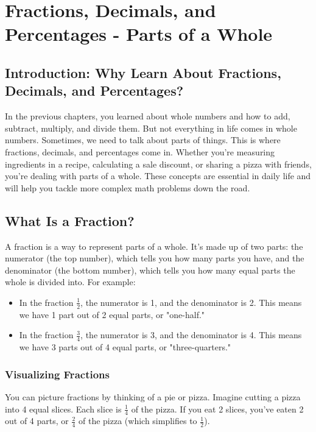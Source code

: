 \chapter{Fractions, Decimals, and Percentages - Parts of a Whole}

\section{Introduction: Why Learn About Fractions, Decimals, and Percentages?}
In the previous chapters, you learned about whole numbers and how to add, subtract, multiply, and divide them. But not everything in life comes in whole numbers. Sometimes, we need to talk about parts of things. This is where fractions, decimals, and percentages come in. Whether you’re measuring ingredients in a recipe, calculating a sale discount, or sharing a pizza with friends, you’re dealing with parts of a whole. These concepts are essential in daily life and will help you tackle more complex math problems down the road.

\section{What Is a Fraction?}
A fraction is a way to represent parts of a whole. It’s made up of two parts: the numerator (the top number), which tells you how many parts you have, and the denominator (the bottom number), which tells you how many equal parts the whole is divided into. For example:
\begin{itemize}
    \item In the fraction $\frac{1}{2}$, the numerator is 1, and the denominator is 2. This means we have 1 part out of 2 equal parts, or "one-half."
    \item In the fraction $\frac{3}{4}$, the numerator is 3, and the denominator is 4. This means we have 3 parts out of 4 equal parts, or "three-quarters."
\end{itemize}

\subsection{Visualizing Fractions}
You can picture fractions by thinking of a pie or pizza. Imagine cutting a pizza into 4 equal slices. Each slice is $\frac{1}{4}$ of the pizza. If you eat 2 slices, you’ve eaten 2 out of 4 parts, or $\frac{2}{4}$ of the pizza (which simplifies to $\frac{1}{2}$).

\begin{center}
    \end{center}

